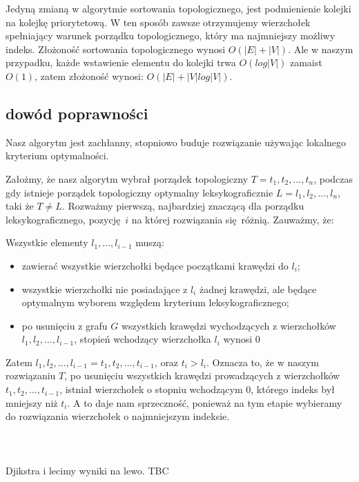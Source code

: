 \documentclass[svgnames]{report}
\begin{document}
Jedyną zmianą w algorytmie sortowania topologicznego, jest podmienienie kolejki na kolejkę priorytetową. W ten sposób zawsze otrzymujemy wierzchołek spełniający warunek porządku topologicznego, który ma najmniejszy możliwy indeks.
Złożoność sortowania topologicznego wynosi $O(|E| + |V|)$. Ale w naszym przypadku, każde wstawienie elementu do kolejki trwa $O(log |V|)$ zamaist $O(1)$, zatem złożoność wynosi: $O(|E| + |V| log |V|)$.

\subsection{dowód poprawności}
Nasz algorytm jest zachłanny, stopniowo buduje rozwiązanie używając lokalnego kryterium optymalności.

Założmy, że nasz algorytm wybrał porządek topologiczny $T = t_1,t_2, \dots, t_n$, podczas gdy istnieje porządek topologiczny optymalny leksykograficznie $L = l_1, l_2, \dots, l_n$, taki że $T \not = L$. Rozważmy pierwszą, najbardziej znaczącą dla porządku leksykograficznego, pozycję $i$ na której rozwiązania się różnią. Zauważmy, że:

Wszystkie elementy $l_1, \dots, l_{i-1}$ muszą:
\begin{itemize}
\item zawierać wszystkie wierzchołki będące początkami krawędzi do $l_i$;
\item wszystkie wierzchołki nie posiadające z $l_i$ żadnej krawędzi, ale będące optymalnym wyborem względem kryterium leksykograficznego;
\item po usunięciu z grafu $G$ wszystkich krawędzi wychodzących z wierzchołków $l_1,l_2, \dots, l_{i-1}$, stopień wchodzący wierzchołka $l_i$ wynosi $0$
\end{itemize}

Zatem $l_1,l_2, \dots, l_{i-1} = t_1, t_2, \dots, t_{i-1}$, oraz $t_i > l_i$. 
Oznacza to, że w naszym rozwiązaniu $T$, po usunięciu wszystkich krawędzi prowadzących z wierzchołków $t_1,t_2, \dots, t_{i-1}$, istniał wierzchołek o stopniu wchodzącym $0$, którego indeks był mniejszy niż $t_i$. A to daje nam sprzeczność, ponieważ na tym etapie wybieramy do rozwiązania wierzchołek o najmniejszym indeksie.

\section{}%
\\
Djikstra i lecimy wyniki na lewo. TBC
\end{document}
